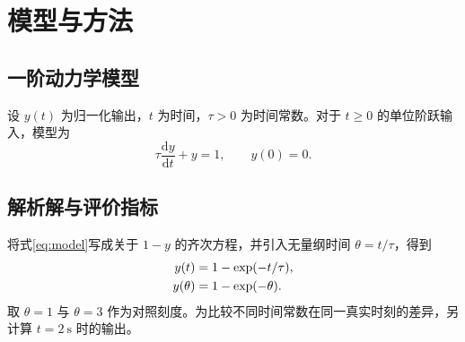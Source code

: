 \section{模型与方法}

\subsection{一阶动力学模型}

设 $y(t)$ 为归一化输出，$t$ 为时间，$\tau>0$ 为时间常数。对于 $t\geq 0$ 的单位阶跃输入，模型为
\begin{equation}
  \tau\frac{\mathrm{d}y}{\mathrm{d}t}+y=1,\qquad y(0)=0.
  \label{eq:model}
\end{equation}

\subsection{解析解与评价指标}

将式\eqref{eq:model}写成关于 $1-y$ 的齐次方程，并引入无量纲时间 $\theta=t/\tau$，得到
\begin{align}
  y(t) &= 1-\exp(-t/\tau), \notag\\
  y(\theta) &= 1-\exp(-\theta). \label{eq:response}
\end{align}
取 $\theta=1$ 与 $\theta=3$ 作为对照刻度。为比较不同时间常数在同一真实时刻的差异，另计算 $t=\qty{2}{\second}$ 时的输出。
